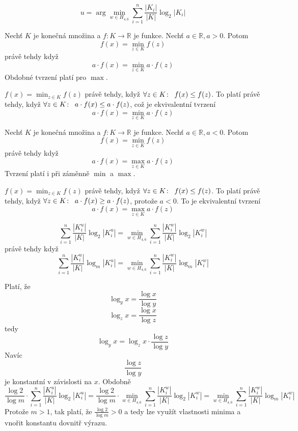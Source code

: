 \[ u = \arg\min_{w \in H_{4,6}} \sum_{i =1}^n \frac{|K_i|}{|K|}\log_2|K_i|\]

\begin{lemma}
    Nechť $K$ je konečná množina a $f \colon K \to \mathbb{R}$ je funkce. Nechť $a \in \mathbb{R}, a > 0$. Potom 
    \[f(x) = \min_{z \in K} f(z)\]
    právě tehdy když
    \[a\cdot f(x) = \min_{z \in K} a\cdot f(z)\]
    Obdobné tvrzení platí pro $\max$.
\end{lemma}
\begin{dukaz}
    $f(x) = \min_{z \in K} f(z)$ právě tehdy, když $\forall z \in K\colon \hspace{5px} f(x) \leq f(z)$. To platí právě tehdy, když $\forall z \in K\colon \hspace{5px} a \cdot f(x) \leq a\cdot f(z)$, což je ekvivalentní tvrzení \[a\cdot f(x) = \min_{z \in K} a\cdot f(z)\]
\end{dukaz}


\begin{tvrz}
    Nechť $K$ je konečná množina a $f \colon K \to \mathbb{R}$ je funkce. Nechť $a \in \mathbb{R}, a < 0$. Potom 
    \[f(x) = \min_{z \in K} f(z)\]
    právě tehdy když
    \[a\cdot f(x) = \max_{z \in K} a\cdot f(z)\]
    Tvrzení platí i při záměnně $\min$ a $\max$.
\end{tvrz}
\begin{dukaz}
    $f(x) = \min_{z \in K} f(z)$ právě tehdy, když $\forall z \in K\colon \hspace{5px} f(x) \leq f(z)$. To platí právě tehdy, když $\forall z \in K\colon \hspace{5px} a \cdot f(x) \geq a\cdot f(z)$, protože $a<0$. To je ekvivalentní tvrzení \[a\cdot f(x) = \max_{z \in K} a\cdot f(z)\]
\end{dukaz}


\begin{veta}
    \[\sum_{i=1}^{n} \frac{|K^u_i|}{|K|} \log_2|K^u_i| = \min_{w \in H_{4,6}} \sum_{i=1}^n \frac{|K^w_i|}{|K|}\log_2|K^w_i|\] 
    právě tehdy když
    \[\sum_{i=1}^{n} \frac{|K^u_i|}{|K|} \log_m|K^u_i| = \min_{w \in H_{4,6}} \sum_{i=1}^n \frac{|K^w_i|}{|K|}\log_m|K^w_i|\] 
\end{veta}
\begin{dukaz}
    Platí, že 
    \[\log_y x = \frac{\log x}{\log y}\]
    \[\log_z x = \frac{\log x}{\log z}\]
    tedy
    \[\log_y x = \log_z x \cdot \frac{\log z}{\log y}\]
    Navíc 
    \[\frac{\log z}{\log y}\]
    je konstantní v závislosti na $x$.
    Obdobně
    \[\frac{\log2}{\log m} \cdot\sum_{i=1}^{n} \frac{|K^u_i|}{|K|} \log_2|K^u_i| 
    = \frac{\log2}{\log m} \cdot \min_{w \in H_{4,6}} \sum_{i=1}^n \frac{|K^w_i|}{|K|}\log_2|K^w_i|
    = \min_{w \in H_{4,6}} \sum_{i=1}^n \frac{|K^w_i|}{|K|}\log_m|K^w_i| \]
    Protože $m > 1$, tak platí, že $\frac{\log2}{\log m} > 0$ a tedy lze využít vlastnosti minima a vnořit konstantu dovnitř výrazu. 
\end{dukaz}

